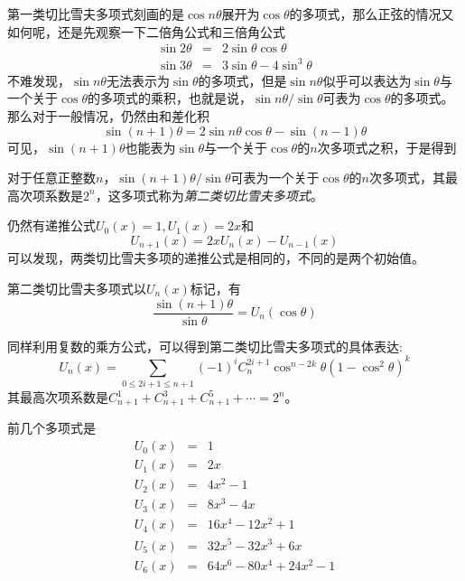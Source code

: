 第一类切比雪夫多项式刻画的是$\cos{n\theta}$展开为$\cos{\theta}$的多项式，那么正弦的情况又如何呢，还是先观察一下二倍角公式和三倍角公式
\begin{eqnarray*}
  \sin{2\theta} & = & 2\sin{\theta}\cos{\theta} \\
  \sin{3\theta} & = & 3\sin{\theta}-4\sin^3{\theta}
\end{eqnarray*}
不难发现，$\sin{n\theta}$无法表示为$\sin{\theta}$的多项式，但是$\sin{n\theta}$似乎可以表达为$\sin{\theta}$与一个关于$\cos{\theta}$的多项式的乘积，也就是说，$\sin{n\theta}/\sin{\theta}$可表为$\cos{\theta}$的多项式。那么对于一般情况，仍然由和差化积
\begin{equation*}
  \sin{(n+1)\theta}=2\sin{n\theta}\cos{\theta}-\sin{(n-1)\theta}
\end{equation*}
可见，$\sin{(n+1)\theta}$也能表为$\sin{\theta}$与一个关于$\cos{\theta}$的$n$次多项式之积，于是得到
\begin{theorem}
  对于任意正整数$n$，$\sin{(n+1)\theta}/\sin{\theta}$可表为一个关于$\cos{\theta}$的$n$次多项式，其最高次项系数是$2^n$，这多项式称为\emph{第二类切比雪夫多项式}。
\end{theorem}

仍然有递推公式$U_0(x)=1, U_1(x)=2x$和
\begin{equation*}
  U_{n+1}(x)=2xU_n(x)-U_{n-1}(x)
\end{equation*}
可以发现，两类切比雪夫多项的递推公式是相同的，不同的是两个初始值。

第二类切比雪夫多项式以$U_n(x)$标记，有
\begin{equation*}
  \frac{\sin{(n+1)\theta}}{\sin{\theta}} = U_n(\cos{\theta})
\end{equation*}

同样利用复数的乘方公式，可以得到第二类切比雪夫多项式的具体表达:
\begin{equation*}
  U_n(x) = \sum_{0 \leqslant 2i+1 \leqslant n+1}(-1)^iC_n^{2i+1}\cos^{n-2k}{\theta}(1-\cos^2{\theta})^{k}
\end{equation*}
其最高次项系数是$C_{n+1}^1+C_{n+1}^3+C_{n+1}^5+\cdots=2^n$。

前几个多项式是
\begin{eqnarray*}
  U_0(x) & = & 1 \\
  U_1(x) & = & 2x \\
  U_2(x) & = & 4x^2-1 \\
  U_3(x) & = & 8x^3-4x \\
  U_4(x) & = & 16x^4-12x^2+1 \\
  U_5(x) & = & 32x^5-32x^3+6x \\
  U_6(x) & = & 64x^6-80x^4+24x^2-1
\end{eqnarray*}

